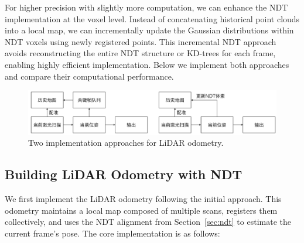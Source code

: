 For higher precision with slightly more computation, we can enhance the NDT implementation at the voxel level. Instead of concatenating historical point clouds into a local map, we can incrementally update the Gaussian distributions within NDT voxels using newly registered points. This incremental NDT approach avoids reconstructing the entire NDT structure or KD-trees for each frame, enabling highly efficient implementation. Below we implement both approaches and compare their computational performance.

\begin{figure}[!thp]
	\centering
	\includegraphics[width=1.0\textwidth]{resources/3d-lidar-mapping/lo-pipeline.pdf}
	\caption{Two implementation approaches for LiDAR odometry.}
	\label{fig:lo-pipeline}
\end{figure}

\subsection{Building LiDAR Odometry with NDT}
\label{sec:ndt-odom}
We first implement the LiDAR odometry following the initial approach. This odometry maintains a local map composed of multiple scans, registers them collectively, and uses the NDT alignment from Section~\ref{sec:ndt} to estimate the current frame's pose. The core implementation is as follows:

